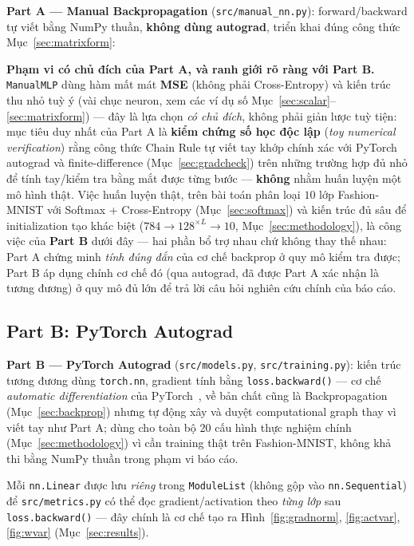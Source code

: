\documentclass[12pt,a4paper]{report}
\newcommand{\en}[1]{\textit{#1}}
\begin{document}
\textbf{Part A --- Manual Backpropagation} (\texttt{src/manual\_nn.py}):
forward/backward tự viết bằng NumPy thuần, \textbf{không dùng autograd},
triển khai đúng công thức Mục~\ref{sec:matrixform}:


\textbf{Phạm vi có chủ đích của Part A, và ranh giới rõ ràng với Part B.}
\texttt{ManualMLP} dùng hàm mất mát \textbf{MSE} (không phải
Cross-Entropy) và kiến trúc thu nhỏ tuỳ ý (vài chục neuron, xem các ví dụ
số Mục~\ref{sec:scalar}--\ref{sec:matrixform}) --- đây là lựa chọn
\emph{có chủ đích}, không phải giản lược tuỳ tiện: mục tiêu duy nhất của
Part A là \textbf{kiểm chứng số học độc lập} (\en{toy numerical
verification}) rằng công thức Chain Rule tự viết tay khớp chính xác với
PyTorch autograd và finite-difference (Mục~\ref{sec:gradcheck}) trên
những trường hợp đủ nhỏ để tính tay/kiểm tra bằng mắt được từng bước ---
\textbf{không} nhằm huấn luyện một mô hình thật. Việc huấn luyện thật,
trên bài toán phân loại $10$ lớp Fashion-MNIST với Softmax + Cross-Entropy
(Mục~\ref{sec:softmax}) và kiến trúc đủ sâu để initialization tạo khác
biệt ($784\to128^{\times L}\to10$, Mục~\ref{sec:methodology}), là công
việc của \textbf{Part B} dưới đây --- hai phần bổ trợ nhau chứ không thay
thế nhau: Part A chứng minh \emph{tính đúng đắn} của cơ chế backprop ở
quy mô kiểm tra được; Part B áp dụng chính cơ chế đó (qua autograd, đã
được Part A xác nhận là tương đương) ở quy mô đủ lớn để trả lời câu hỏi
nghiên cứu chính của báo cáo.

\subsection{Part B: PyTorch Autograd}

\textbf{Part B --- PyTorch Autograd} (\texttt{src/models.py},
\texttt{src/training.py}): kiến trúc tương đương dùng \texttt{torch.nn},
gradient tính bằng \texttt{loss.backward()} --- cơ chế \en{automatic
differentiation} của PyTorch~\citep{paszke2019pytorch}, về bản chất cũng
là Backpropagation (Mục~\ref{sec:backprop}) nhưng tự động xây và duyệt
computational graph thay vì viết tay như Part A; dùng cho toàn bộ 20 cấu
hình thực nghiệm chính (Mục~\ref{sec:methodology}) vì cần training thật
trên Fashion-MNIST, không khả thi bằng NumPy thuần trong phạm vi báo cáo.


Mỗi \texttt{nn.Linear} được lưu \emph{riêng} trong \texttt{ModuleList}
(không gộp vào \texttt{nn.Sequential}) để \texttt{src/metrics.py} có thể
đọc gradient/activation theo \emph{từng lớp} sau \texttt{loss.backward()}
--- đây chính là cơ chế tạo ra Hình~\ref{fig:gradnorm}, \ref{fig:actvar},
\ref{fig:wvar} (Mục~\ref{sec:results}).
\end{document}
